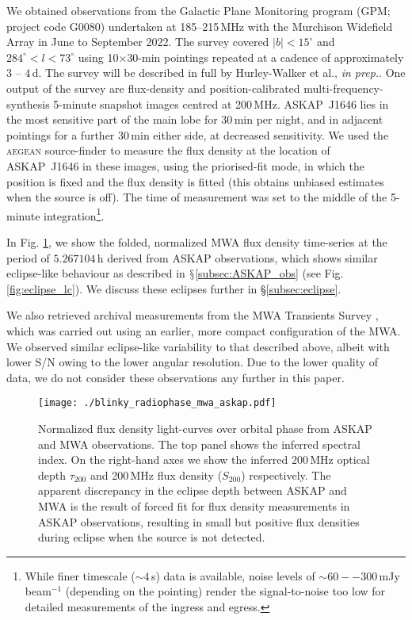 \documentclass[fleqn,usenatbib]{mnras}
\newcommand{\blinkyaskap}{{ASKAP}~J1646}
\newcommand{\periodhval}{$5.267104$}
\begin{document}
We obtained observations from the Galactic Plane Monitoring program (GPM; project code G0080) undertaken at 185--215\,MHz with the Murchison Widefield Array \citep[in ``Phase \textsc{ii} extended-configuration''][]{2013PASA...30....7T,2018PASA...35...33W} in June to September 2022. The survey covered $|b|<15^\circ$ and $284^\circ<l<73^\circ$ using 10$\times$30-min pointings repeated at a cadence of approximately $3$ -- $4$\,d. The survey will be described in full by Hurley-Walker et al., \textit{in prep.}. One output of the survey are flux-density and position-calibrated multi-frequency-synthesis 5-minute snapshot images centred at 200\,MHz. \blinkyaskap{} lies in the most sensitive part of the main lobe for 30\,min per night, and in adjacent pointings for a further 30\,min either side, at decreased sensitivity. We used the \textsc{aegean} source-finder \citep{2012MNRAS.422.1812H,2018PASA...35...11H} to measure the flux density at the location of \blinkyaskap{} in these images, using the priorised-fit mode, in which the position is fixed and the flux density is fitted (this obtains unbiased estimates when the source is off). The time of measurement was set to the middle of the 5-minute integration\footnote{While finer timescale ($\sim4$\,s) data is available, noise levels of $\sim60--300$\,mJy\,beam$^{-1}$ (depending on the pointing) render the signal-to-noise too low for detailed measurements of the ingress and egress.}.

In Fig. \ref{fig:mwa_askap_spidx}, we show the folded, normalized MWA flux density time-series at the period of \periodhval{}\,h derived from ASKAP observations, which shows similar eclipse-like behaviour as described in $\mathsection$\ref{subsec:ASKAP_obs} (see Fig. \ref{fig:eclipse_lc}). We discuss these eclipses further in \S\ref{subsec:eclipse}.

We also retrieved archival measurements from the MWA Transients Survey \citep[MWATS][]{2019MNRAS.482.2484B}, which was carried out using an earlier, more compact configuration of the MWA. We observed similar eclipse-like variability to that described above, albeit with lower S/N owing to the lower angular resolution. Due to the lower quality of data, we do not consider these observations any further in this paper.

\begin{figure}
    \centering
    \texttt{[image: ./blinky\_radiophase\_mwa\_askap.pdf]}
    \caption{Normalized flux density light-curves over orbital phase from ASKAP and MWA observations. The top panel shows the inferred spectral index. On the right-hand axes we show the inferred 200\,MHz optical depth $\tau_{200}$ and 200\,MHz flux density ($S_{200}$) respectively. {The apparent discrepancy in the eclipse depth between ASKAP and MWA is the result of forced fit for flux density measurements in ASKAP observations, resulting in small but positive flux densities during eclipse when the source is not detected.}}
    \label{fig:mwa_askap_spidx}
\end{figure}
\end{document}
